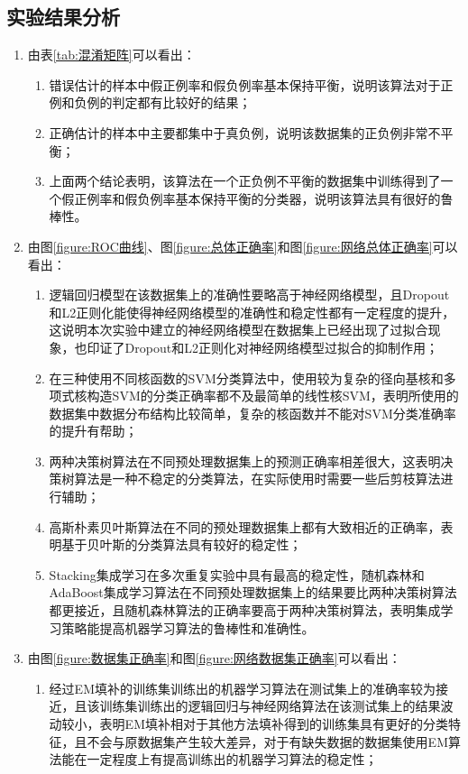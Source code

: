 \documentclass[a4paper]{ctexart}
\begin{document}
\subsection{实验结果分析}
\begin{enumerate}
	\item 由表\ref{tab:混淆矩阵}可以看出：
	\begin{enumerate}[label=\alph*)]
		\item 错误估计的样本中假正例率和假负例率基本保持平衡，说明该算法对于正例和负例的判定都有比较好的结果；
		\item 正确估计的样本中主要都集中于真负例，说明该数据集的正负例非常不平衡；
		\item 上面两个结论表明，该算法在一个正负例不平衡的数据集中训练得到了一个假正例率和假负例率基本保持平衡的分类器，说明该算法具有很好的鲁棒性。
	\end{enumerate}
	\item 由图\ref{figure:ROC曲线}、图\ref{figure:总体正确率}和图\ref{figure:网络总体正确率}可以看出：
	      \begin{enumerate}[label=\alph*)]
		      \item 逻辑回归模型在该数据集上的准确性要略高于神经网络模型，且Dropout和L2正则化能使得神经网络模型的准确性和稳定性都有一定程度的提升，这说明本次实验中建立的神经网络模型在数据集上已经出现了过拟合现象，也印证了Dropout和L2正则化对神经网络模型过拟合的抑制作用；
		      \item 在三种使用不同核函数的SVM分类算法中，使用较为复杂的径向基核和多项式核构造SVM的分类正确率都不及最简单的线性核SVM，表明所使用的数据集中数据分布结构比较简单，复杂的核函数并不能对SVM分类准确率的提升有帮助；
		      \item 两种决策树算法在不同预处理数据集上的预测正确率相差很大，这表明决策树算法是一种不稳定的分类算法，在实际使用时需要一些后剪枝算法进行辅助\cite{dwyer2007decision}；
			  \item 高斯朴素贝叶斯算法在不同的预处理数据集上都有大致相近的正确率，表明基于贝叶斯的分类算法具有较好的稳定性；
			  \item Stacking集成学习在多次重复实验中具有最高的稳定性，随机森林和AdaBoost集成学习算法在不同预处理数据集上的结果要比两种决策树算法都更接近，且随机森林算法的正确率要高于两种决策树算法，表明集成学习策略能提高机器学习算法的鲁棒性和准确性。
	      \end{enumerate}
	\item 由图\ref{figure:数据集正确率}和图\ref{figure:网络数据集正确率}可以看出：
	      \begin{enumerate}[label=\alph*)]
		      \item 经过EM填补的训练集训练出的机器学习算法在测试集上的准确率较为接近，且该训练集训练出的逻辑回归与神经网络算法在该测试集上的结果波动较小，表明EM填补相对于其他方法填补得到的训练集具有更好的分类特征，且不会与原数据集产生较大差异，对于有缺失数据的数据集使用EM算法能在一定程度上有提高训练出的机器学习算法的稳定性；

\end{enumerate}
\end{enumerate}
\end{document}
